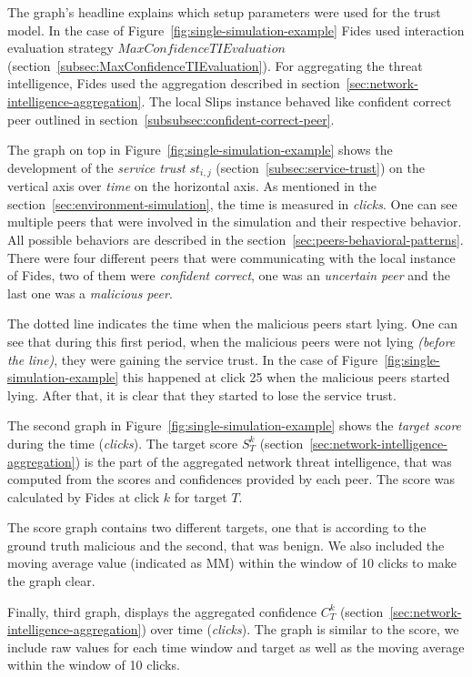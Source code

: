 The graph's headline explains which setup parameters were used for the trust model. In the case of Figure~\ref{fig:single-simulation-example} Fides used interaction evaluation strategy $MaxConfidenceTIEvaluation$ (section~\ref{subsec:MaxConfidenceTIEvaluation}).
For aggregating the threat intelligence, Fides used the aggregation described in  section~\ref{sec:network-intelligence-aggregation}.
The local Slips instance behaved like confident correct peer outlined in  section~\ref{subsubsec:confident-correct-peer}.

The graph on top in Figure~\ref{fig:single-simulation-example} shows the development of the \textit{service trust} $st_{i, j}$ (section~\ref{subsec:service-trust}) on the vertical axis over \textit{time} on the horizontal axis. As mentioned in the section~\ref{sec:environment-simulation}, the time is measured in \textit{clicks}.
One can see multiple peers that were involved in the simulation and their respective behavior. All possible behaviors are described in the section~\ref{sec:peers-behavioral-patterns}.
There were four different peers that were communicating with the local instance of Fides, two of them were \textit{confident correct}, one was an \textit{uncertain peer} and the last one was a \textit{malicious peer}.

The dotted line indicates the time when the malicious peers start lying.
One can see that during this first period, when the malicious peers were not lying \textit{(before the line)}, they were gaining the service trust.
In the case of Figure~\ref{fig:single-simulation-example} this happened at click 25 when the malicious peers started lying.
After that, it is clear that they started to lose the service trust.

The second graph in Figure~\ref{fig:single-simulation-example} shows the \textit{target score} during the time (\textit{clicks}).
The target score $S^{k}_{T}$ (section~\ref{sec:network-intelligence-aggregation}) is the part of the aggregated network threat intelligence, that was computed from the scores and confidences provided by each peer.
The score was calculated by Fides at click $k$ for target $T$.

The score graph contains two different targets, one that is according to the ground truth malicious and the second, that was benign.
We also included the moving average value (indicated as MM) within the window of 10 clicks to make the graph clear.

Finally, third graph, displays the aggregated confidence $C^{k}_{T}$ (section~\ref{sec:network-intelligence-aggregation}) over time (\textit{clicks}).
The graph is similar to the score, we include raw values for each time window and target as well as the moving average within the window of 10 clicks.

